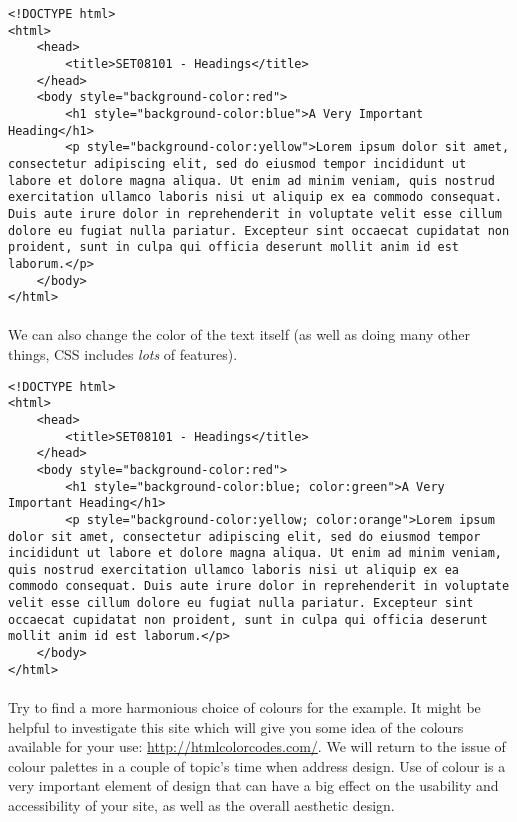 \documentclass[10pt, a4paper]{article}
\begin{document}
\begin{lstlisting}
<!DOCTYPE html>
<html>
    <head>
        <title>SET08101 - Headings</title>
    </head>
    <body style="background-color:red">
        <h1 style="background-color:blue">A Very Important Heading</h1>
        <p style="background-color:yellow">Lorem ipsum dolor sit amet, consectetur adipiscing elit, sed do eiusmod tempor incididunt ut labore et dolore magna aliqua. Ut enim ad minim veniam, quis nostrud exercitation ullamco laboris nisi ut aliquip ex ea commodo consequat. Duis aute irure dolor in reprehenderit in voluptate velit esse cillum dolore eu fugiat nulla pariatur. Excepteur sint occaecat cupidatat non proident, sunt in culpa qui officia deserunt mollit anim id est laborum.</p>
    </body>
</html>
\end{lstlisting}

\paragraph{} We can also change the color of the text itself (as well as doing many other things, CSS includes \emph{lots} of features).

\begin{lstlisting}
<!DOCTYPE html>
<html>
    <head>
        <title>SET08101 - Headings</title>
    </head>
    <body style="background-color:red">
        <h1 style="background-color:blue; color:green">A Very Important Heading</h1>
        <p style="background-color:yellow; color:orange">Lorem ipsum dolor sit amet, consectetur adipiscing elit, sed do eiusmod tempor incididunt ut labore et dolore magna aliqua. Ut enim ad minim veniam, quis nostrud exercitation ullamco laboris nisi ut aliquip ex ea commodo consequat. Duis aute irure dolor in reprehenderit in voluptate velit esse cillum dolore eu fugiat nulla pariatur. Excepteur sint occaecat cupidatat non proident, sunt in culpa qui officia deserunt mollit anim id est laborum.</p>
    </body>
</html>
\end{lstlisting}

\paragraph{} Try to find a more harmonious choice of colours for the example. It might be helpful to investigate this site which will give you some idea of the colours available for your use: \url{http://htmlcolorcodes.com/}. We will return to the issue of colour palettes in a couple of topic's time when address design. Use of colour is a very important element of design that can have a big effect on the usability and accessibility of your site, as well as the overall aesthetic design.
\end{document}
